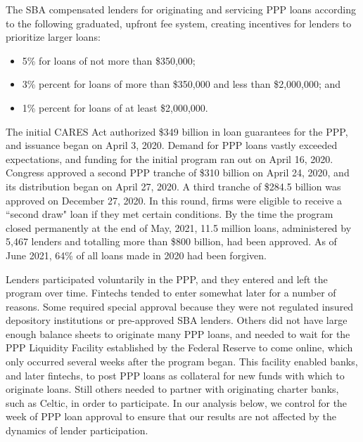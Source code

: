 \documentclass[11pt]{article}
\begin{document}
The SBA compensated lenders for originating and servicing PPP loans according to the following graduated, upfront fee system, creating incentives for lenders to prioritize larger loans:\vspace{-.1cm}
\begin{itemize}
\item 5\% for loans of not more than \$350,000; \vspace{-.3cm}
\item 3\% percent for loans of more than \$350,000 and less than \$2,000,000; and \vspace{-.3cm}
\item 1\%  percent for loans of at least \$2,000,000. \vspace{-.1cm}
\end{itemize}

\noindent The initial CARES Act authorized \$349 billion in loan guarantees for the PPP, and issuance began on April 3, 2020. Demand for PPP loans vastly exceeded expectations, and funding for the initial program ran out on April 16, 2020. Congress approved a second PPP tranche of  \$310 billion on April 24, 2020, and its distribution began on April 27, 2020. A third tranche of \$284.5 billion was approved on December 27, 2020. In this round, firms were eligible to receive a ``second draw" loan if they met certain conditions. By the time the program closed permanently at the end of May, 2021, 11.5 million loans, administered by 5,467 lenders and totalling more than \$800 billion, had been approved. As of June 2021, 64\% of all loans made in 2020 had been forgiven.

Lenders participated voluntarily in the PPP, and they entered and left the program over time. Fintechs tended to enter somewhat later for a number of reasons. Some required special approval because they were not regulated insured depository institutions or pre-approved SBA lenders. Others did not have large enough balance sheets to originate many PPP loans, and needed to wait for the PPP Liquidity Facility established by the Federal Reserve to come online, which only occurred several weeks after the program began. This facility enabled banks, and later fintechs, to post PPP loans as collateral for new funds with which to originate loans. Still others needed to partner with originating charter banks, such as Celtic, in order to participate. In our analysis below, we control for the week of PPP loan approval to ensure that our results are not affected by the dynamics of lender participation.
\end{document}
